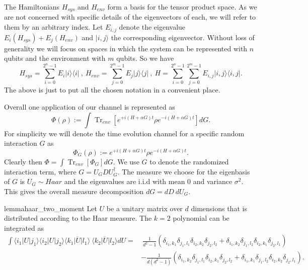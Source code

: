 \documentclass{article}
\newcommand{\ket}[1]{|#1\rangle}
\newcommand{\bra}[1]{\langle #1|}
\newcommand{\ketbra}[2]{| #1\rangle\! \langle #2|}
\newcommand{\parens}[1]{\left( #1 \right)}
\newcommand{\brackets}[1]{\left[ #1 \right]}
\DeclareMathOperator{\Tr}{Tr}
\newcommand{\partrace}[2]{\Tr_{#1} \brackets{ #2 }}
\begin{document}
The Hamiltonians $H_{sys}$ and $H_{env}$ form a basis for the tensor product space. As we are not concerned with specific details of the eigenvectors of each, we will refer to them by an arbitrary index. Let $E_{i,j}$ denote the eigenvalue $E_i(H_{sys}) + E_j(H_{env})$ and $\ket{i,j}$ the corresponding eigenvector. Without loss of generality we will focus on spaces in which the system can be represented with $n$ qubits and the environment with $m$ qubits. So we have
\begin{equation}
    H_{sys} = \sum_{i = 0}^{2^n - 1} E_i \ketbra{i}{i} ~,~ H_{env} = \sum_{j=0}^{2^m - 1} E_j \ketbra{j}{j} ~,~ H = \sum_{i=0}^{2^n - 1} \sum_{j=0}^{2^m - 1} E_{i,j} \ketbra{i,j}{i,j}.
\end{equation}
The above is just to put all the chosen notation in a convenient place. 


Overall one application of our channel is represented as
\begin{equation}
    \Phi(\rho) := \int \partrace{env}{e^{+i(H + \alpha G)t} \rho e^{-i(H + \alpha G) t}} dG.
\end{equation}
For simplicity we will denote the time evolution channel for a specific random interaction $G$ as
\begin{equation}
    \Phi_G(\rho) := e^{+i (H+ \alpha G) t} \rho e^{-i (H + \alpha G) t}. \label{eq:phi_g_definition}
\end{equation}
Clearly then $\Phi = \int \partrace{env}{\Phi_G} dG$. We use $G$ to denote the randomized interaction term, where $G = U_G D U_G^\dagger$. The measure we choose for the eigenbasis of $G$ is $U_G \sim Haar$ and the eigenvalues are i.i.d with mean 0 and variance $\sigma^2$. This gives the overall measure decomposition $dG = dD ~ dU_G$. 

\begin{restatable}{lemma}{haar_two_moment} \label{lem:haar_two_moment}
    Let $U$ be a unitary matrix over $d$ dimensions that is distributed according to the Haar measure. The $k=2$ polynomial can be integrated as
    \begin{align}
        \int \bra{i_1} U \ket{j_1} \bra{i_2} U \ket{j_2} \overline{\bra{k_1} U \ket{l_1}} ~ \overline{\bra{k_2} U \ket{l_2}} dU =& ~\frac{1}{d^2 - 1} \parens{\delta_{i_1, k_1} \delta_{j_1, l_1} \delta_{i_2, k_2} \delta_{j_2, l_2} + \delta_{i_1, k_2} \delta_{j_1, l_2} \delta_{i_2, k_1} \delta_{j_2, l_1}} \nonumber \\
        &- \frac{1}{d(d^2 - 1)} \parens{\delta_{i_1, k_2} \delta_{j_1, l_1} \delta_{i_2, k_1} \delta_{j_2, l_2} + \delta_{i_1, k_1} \delta_{j_1, l_2} \delta_{i_2, k_2} \delta_{j_2, l_1}}. \label{eq:haar_two_moment_integral}
    \end{align}
    \end{restatable}
\end{document}
